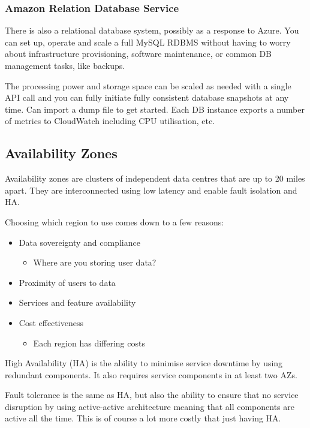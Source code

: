 \documentclass[11pt,a4paper,titlepage,dvipsnames,cmyk]{scrartcl}
\begin{document}
\subsubsection{Amazon Relation Database Service}
There is also a relational database system, possibly as a response to Azure. You can set up, operate and scale a full MySQL RDBMS without having to worry about infrastructure provisioning, software maintenance, or common DB management tasks, like backups.

The processing power and storage space can be scaled as needed with a single API call and you can fully initiate fully consistent database snapshots at any time. Can import a dump file to get started. Each DB instance exports a number of metrics to CloudWatch including CPU utilisation, etc.

\subsection{Availability Zones}
Availability zones are clusters of independent data centres that are up to 20 miles apart. They are interconnected using low latency and enable fault isolation and HA.

Choosing which region to use comes down to a few reasons:
\begin{itemize}
    \item Data sovereignty and compliance
    \begin{itemize}
        \item Where are you storing user data?
    \end{itemize}
    \item Proximity of users to data
    \item Services and feature availability
    \item Cost effectiveness
    \begin{itemize}
        \item Each region has differing costs
    \end{itemize}
\end{itemize}

High Availability (HA) is the ability to minimise service downtime by using redundant components. It also requires service components in at least two AZs.

Fault tolerance is the same as HA, but also the ability to ensure that no service disruption by using active-active architecture meaning that all components are active all the time. This is of course a lot more costly that just having HA.
\end{document}
